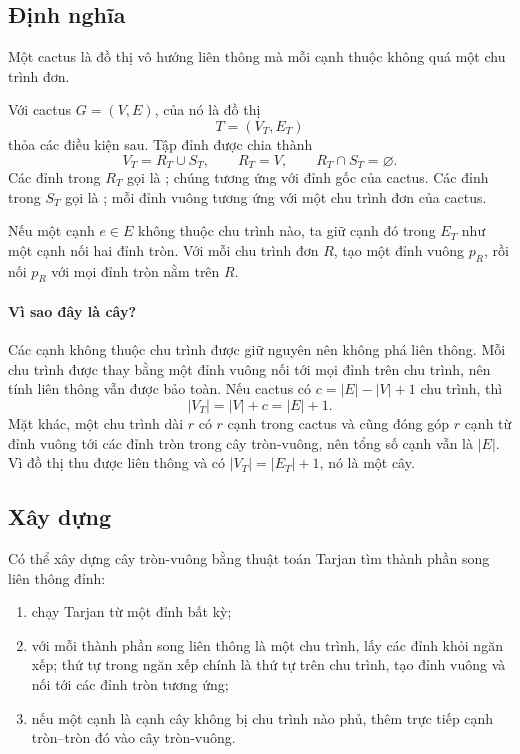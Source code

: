 \documentclass[11pt]{article}
\newcommand{\VT}{V_T}
\newcommand{\ET}{E_T}
\newcommand{\RT}{R_T}
\newcommand{\ST}{S_T}
\begin{document}
\subsection{Định nghĩa}

Một cactus là đồ thị vô hướng liên thông mà mỗi cạnh thuộc không quá một chu
trình đơn.

Với cactus \(G=(V,E)\),  của nó là đồ thị
\[
  T=(\VT,\ET)
\]
thỏa các điều kiện sau. Tập đỉnh được chia thành
\[
  \VT=\RT\cup\ST,\qquad \RT=V,\qquad \RT\cap\ST=\varnothing.
\]
Các đỉnh trong \(\RT\) gọi là ; chúng tương ứng với đỉnh gốc
của cactus. Các đỉnh trong \(\ST\) gọi là ; mỗi đỉnh vuông
tương ứng với một chu trình đơn của cactus.

Nếu một cạnh \(e\in E\) không thuộc chu trình nào, ta giữ cạnh đó trong
\(\ET\) như một cạnh nối hai đỉnh tròn. Với mỗi chu trình đơn \(R\), tạo một
đỉnh vuông \(p_R\), rồi nối \(p_R\) với mọi đỉnh tròn nằm trên \(R\).

\paragraph{Vì sao đây là cây?}
Các cạnh không thuộc chu trình được giữ nguyên nên không phá liên thông. Mỗi
chu trình được thay bằng một đỉnh vuông nối tới mọi đỉnh trên chu trình, nên
tính liên thông vẫn được bảo toàn. Nếu cactus có \(c=|E|-|V|+1\) chu trình,
thì
\[
  |\VT|=|V|+c=|E|+1.
\]
Mặt khác, một chu trình dài \(r\) có \(r\) cạnh trong cactus và cũng đóng góp
\(r\) cạnh từ đỉnh vuông tới các đỉnh tròn trong cây tròn-vuông, nên tổng số
cạnh vẫn là \(|E|\). Vì đồ thị thu được liên thông và có
\(|\VT|=|\ET|+1\), nó là một cây.

\subsection{Xây dựng}

Có thể xây dựng cây tròn-vuông bằng thuật toán Tarjan tìm thành phần song liên
thông đỉnh:
\begin{enumerate}
  \item chạy Tarjan từ một đỉnh bất kỳ;
  \item với mỗi thành phần song liên thông là một chu trình, lấy các đỉnh khỏi
        ngăn xếp; thứ tự trong ngăn xếp chính là thứ tự trên chu trình, tạo
        đỉnh vuông và nối tới các đỉnh tròn tương ứng;
  \item nếu một cạnh là cạnh cây không bị chu trình nào phủ, thêm trực tiếp
        cạnh tròn--tròn đó vào cây tròn-vuông.
\end{enumerate}
\end{document}
